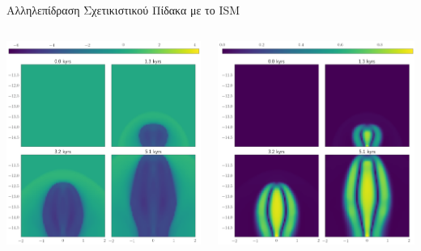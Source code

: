 \documentclass{beamer}
\begin{document}
\begin{frame}{Αλληλεπίδραση Σχετικιστικού Πίδακα με το ISM}
	\begin{columns}
		
\begin{center}
	\includegraphics[width=1\linewidth]{../Document/DataImages/JetISMRHO}
\end{center}
		
\begin{center}
	\includegraphics[width=1\linewidth]{../Document/DataImages/JetISMV}
\end{center}
	\end{columns}
\end{frame}
\end{document}
